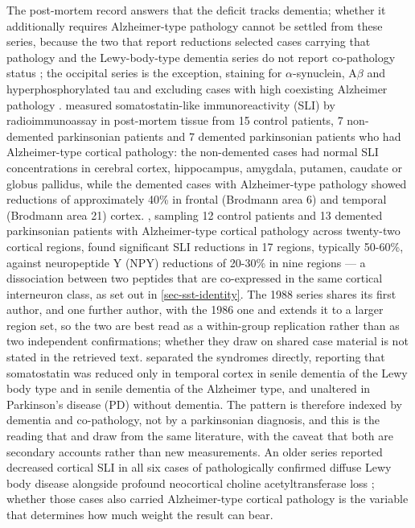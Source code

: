 \documentclass[11pt]{article}
\begin{document}
The post-mortem record answers that the deficit tracks dementia; whether it additionally requires Alzheimer-type pathology cannot be settled from these series, because the two that report reductions selected cases carrying that pathology \citep{Beal1986d,FlintBeal1988} and the Lewy-body-type dementia series do not report co-pathology status \citep{Whitford1988,Leake1991}; the occipital series is the exception, staining for $\alpha$-synuclein, A$\beta$ and hyperphosphorylated tau and excluding cases with high coexisting Alzheimer pathology \citep{Khundakar2016}. \citet{Beal1986d} measured somatostatin-like immunoreactivity (SLI) by radioimmunoassay in post-mortem tissue from 15 control patients, 7 non-demented parkinsonian patients and 7 demented parkinsonian patients who had Alzheimer-type cortical pathology: the non-demented cases had normal SLI concentrations in cerebral cortex, hippocampus, amygdala, putamen, caudate or globus pallidus, while the demented cases with Alzheimer-type pathology showed reductions of approximately 40\% in frontal (Brodmann area 6) and temporal (Brodmann area 21) cortex. \citet{FlintBeal1988}, sampling 12 control patients and 13 demented parkinsonian patients with Alzheimer-type cortical pathology across twenty-two cortical regions, found significant SLI reductions in 17 regions, typically 50-60\%, against neuropeptide Y (NPY) reductions of 20-30\% in nine regions --- a dissociation between two peptides that are co-expressed in the same cortical interneuron class, as set out in \ref{sec-sst-identity}. The 1988 series shares its first author, and one further author, with the 1986 one and extends it to a larger region set, so the two are best read as a within-group replication rather than as two independent confirmations; whether they draw on shared case material is not stated in the retrieved text. \citet{Leake1991} separated the syndromes directly, reporting that somatostatin was reduced only in temporal cortex in senile dementia of the Lewy body type and in senile dementia of the Alzheimer type, and unaltered in Parkinson's disease (PD) without dementia. The pattern is therefore indexed by dementia and co-pathology, not by a parkinsonian diagnosis, and this is the reading that \citet{Leake1993} and \citet{Beal1990} draw from the same literature, with the caveat that both are secondary accounts rather than new measurements. An older series reported decreased cortical SLI in all six cases of pathologically confirmed diffuse Lewy body disease alongside profound neocortical choline acetyltransferase loss \citep{Dickson1987}; whether those cases also carried Alzheimer-type cortical pathology is the variable that determines how much weight the result can bear.
\end{document}
